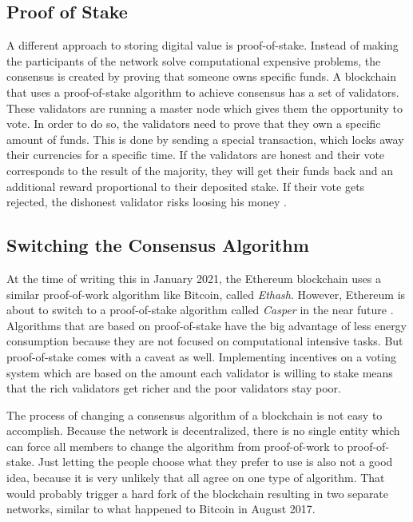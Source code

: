 \subsection{Proof of Stake}
A different approach to storing digital value is proof-of-stake. Instead of making the participants of the network solve computational expensive problems, the consensus is created by proving that someone owns specific funds. A blockchain that uses a proof-of-stake algorithm to achieve consensus has a set of validators. These validators are running a master node which gives them the opportunity to vote. In order to do so, the validators need to prove that they own a specific amount of funds. This is done by sending a special transaction, which locks away their currencies for a specific time. If the validators are honest and their vote corresponds to the result of the majority, they will get their funds back and an additional reward proportional to their deposited stake. If their vote gets rejected, the dishonest validator risks loosing his money \cite{AntonopoulosWood2018}.

\subsection{Switching the Consensus Algorithm}
At the time of writing this in January 2021, the Ethereum blockchain uses a similar proof-of-work algorithm like Bitcoin, called \textit{Ethash}. However, Ethereum is about to switch to a proof-of-stake algorithm called \textit{Casper} in the near future \cite{Twitter2018}. Algorithms that are based on proof-of-stake have the big advantage of less energy consumption because they are not focused on computational intensive tasks. But proof-of-stake comes with a caveat as well. Implementing incentives on a voting system which are based on the amount each validator is willing to stake means that the rich validators get richer and the poor validators stay poor.

The process of changing a consensus algorithm of a blockchain is not easy to accomplish. Because the network is decentralized, there is no single entity which can force all members to change the algorithm from proof-of-work to proof-of-stake. Just letting the people choose what they prefer to use is also not a good idea, because it is very unlikely that all agree on one type of algorithm. That would probably trigger a hard fork of the blockchain resulting in two separate networks, similar to what happened to Bitcoin in August 2017.

